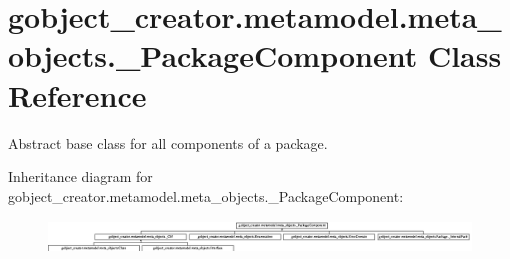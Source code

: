\hypertarget{classgobject__creator_1_1metamodel_1_1meta__objects_1_1__PackageComponent}{
\section{gobject\_\-creator.metamodel.meta\_\-objects.\_\-PackageComponent Class Reference}
\label{classgobject__creator_1_1metamodel_1_1meta__objects_1_1__PackageComponent}
}


Abstract base class for all components of a package.  


Inheritance diagram for gobject\_\-creator.metamodel.meta\_\-objects.\_\-PackageComponent:\begin{figure}[H]
\begin{center}
\leavevmode
\includegraphics[height=0.877285cm]{classgobject__creator_1_1metamodel_1_1meta__objects_1_1__PackageComponent}
\end{center}
\end{figure}
